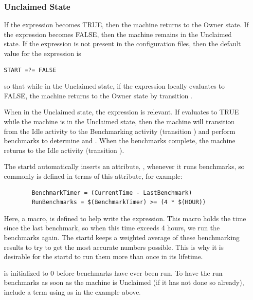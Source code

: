 \subsubsection{\label{sec:Unclaimed-State}Unclaimed State}

If the  expression becomes TRUE, then the machine returns
to the Owner state.
If the  expression becomes FALSE, then the machine remains
in the Unclaimed state.
If the  expression is not present in the configuration files,
then the default value for the  expression is 
\begin{verbatim}
START =?= FALSE
\end{verbatim}
so that
while in the Unclaimed state, if the  expression locally
evaluates to FALSE, the machine returns to the Owner state by
transition .

When in the Unclaimed state,
the 
expression is relevant.
If  evaluates to TRUE while the machine
is in the Unclaimed state,
then the machine will transition from the Idle
activity to the Benchmarking activity (transition ) and
perform benchmarks to determine  and .  
When the benchmarks complete, the machine returns to the Idle activity
(transition ).

The startd automatically inserts an attribute, ,
whenever it runs benchmarks, so commonly  is
defined in terms of this attribute, for example:
\begin{verbatim}
        BenchmarkTimer = (CurrentTime - LastBenchmark)
        RunBenchmarks = $(BenchmarkTimer) >= (4 * $(HOUR))
\end{verbatim}
Here, a macro,  is defined to help write the
expression.
This macro holds the time since the last benchmark,
so when this time exceeds 4 hours, we run the benchmarks again.
The startd keeps a weighted average of these benchmarking
results to try to get the most accurate numbers possible.
This is why
it is desirable for 
the startd to run them more than once in its lifetime.

\Note {} is initialized to 0 before benchmarks
have ever been run.
To have the  run benchmarks as soon as the machine is
Unclaimed (if it has not done so already),
include a term using  as in the example above.

